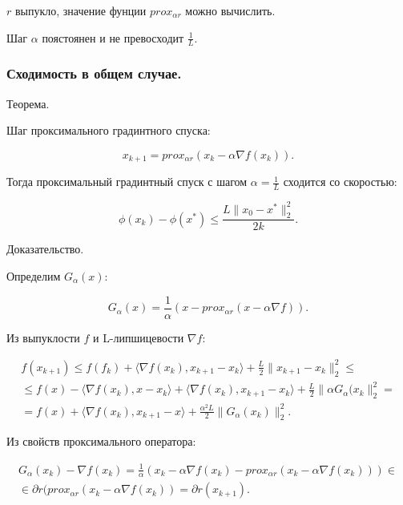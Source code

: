 $r$ выпукло, значение фунции $prox_{\alpha r}$ можно вычислить.

Шаг $\alpha$ поястоянен и не превосходит $\frac1L$.

\subsubsection*{Сходимость в общем случае.}

Теорема.

Шаг проксимального градинтного спуска:

\begin{equation}
    x_{k+1}=prox_{\alpha r}(x_k-\alpha\nabla f(x_k)).
\end{equation}

Тогда проксимальный градинтный спуск с шагом $\alpha=\frac1L$ сходится со скоростью:

\begin{equation}
    \phi(x_k)-\phi(x^*)\leq\frac{L\|x_0-x^*\|_2^2}{2k}.
\end{equation}

Доказательство.

Определим $ G_\alpha(x)$:

\begin{equation}
    G_\alpha(x)=\frac1\alpha\left(x-prox_{\alpha r}(x-\alpha\nabla f)\right).
\end{equation}

Из выпуклости $f$ и L-липшицевости $\nabla f$:

\begin{equation}
\begin{aligned}
    f(x_{k+1})\leq
    f(f_k)+\langle\nabla f(x_k),x_{k+1}-x_k\rangle+\frac L2\|x_{k+1}-x_k\|_2^2\leq\\\leq
    f(x)-\langle\nabla f(x_k),x-x_k\rangle+\langle\nabla f(x_k),x_{k+1}-x_k\rangle+\frac L2\|\alpha G_\alpha(x_k\|_2^2=\\=
    f(x)+\langle\nabla f(x_k),x_{k+1}-x\rangle+\frac{\alpha^2L}2\|G_\alpha(x_k)\|_2^2.
\end{aligned}
\end{equation}

Из свойств проксимального оператора:

\begin{equation}
\begin{aligned}
    G_\alpha(x_k)-\nabla f(x_k)=
    \frac1\alpha\left(x_k-\alpha\nabla f(x_k)-prox_{\alpha r}(x_k-\alpha\nabla f(x_k))\right)\in\\\in\partial r(prox_{\alpha r}(x_k-\alpha\nabla f(x_k))=\partial r(x_{k+1}).
\end{aligned}
\end{equation}

